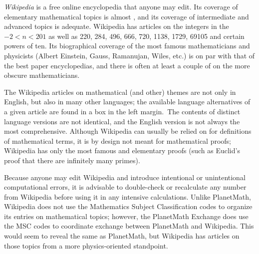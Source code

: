\documentclass[12pt]{article}
\begin{document}
{\em Wikipedia} is a free online encyclopedia that anyone may edit. Its coverage of elementary mathematical topics is almost , and its coverage of intermediate and advanced topics is adequate. Wikipedia has articles on the integers in the  $-2 < n < 201$ as well as 220, 284, 496, 666, 720, 1138, 1729, 69105 and certain powers of ten. Its biographical coverage of the most famous mathematicians and physicists (Albert Einstein, Gauss, Ramanujan, Wiles, etc.) is on par with that of the best paper encyclopedias, and there is often at least a couple of  on the more obscure mathematicians.

The Wikipedia articles on mathematical (and other) themes are not only in English, but also in many other languages; the available language alternatives of a given article are found in a box in the left margin.\, The contents of distinct language versions are not identical, and the English version is not always the most comprehensive. Although Wikipedia can usually be relied on for definitions of mathematical terms, it is by design not meant for mathematical  proofs; Wikipedia has only the most famous and elementary proofs (such as Euclid's proof that there are infinitely many primes).

Because anyone may edit Wikipedia and introduce intentional or unintentional computational errors, it is advisable to double-check or recalculate any number from Wikipedia before using it in any intensive calculations. Unlike PlanetMath, Wikipedia does not use the Mathematics Subject Classification codes to organize its entries on mathematical topics; however, the PlanetMath Exchange does use the MSC codes to coordinate exchange between PlanetMath and Wikipedia. This would seem to reveal the same  as PlanetMath, but Wikipedia has articles on those topics from a more physics-oriented standpoint.
\end{document}
